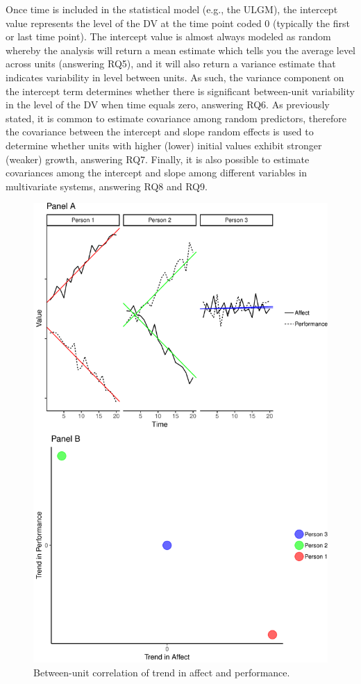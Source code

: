 \documentclass[english,,man]{apa6}
\theoremstyle{definition}
\theoremstyle{definition}
\theoremstyle{definition}
\theoremstyle{remark}
\begin{document}
Once time is included in the statistical model (e.g., the ULGM), the
intercept value represents the level of the DV at the time point coded 0
(typically the first or last time point). The intercept value is almost
always modeled as random whereby the analysis will return a mean
estimate which tells you the average level across units (answering RQ5),
and it will also return a variance estimate that indicates variability
in level between units. As such, the variance component on the intercept
term determines whether there is significant between-unit variability in
the level of the DV when time equals zero, answering RQ6. As previously
stated, it is common to estimate covariance among random predictors,
therefore the covariance between the intercept and slope random effects
is used to determine whether units with higher (lower) initial values
exhibit stronger (weaker) growth, answering RQ7. Finally, it is also
possible to estimate covariances among the intercept and slope among
different variables in multivariate systems, answering RQ8 and RQ9.

\begin{figure}
\centering
\includegraphics{figures/unnamed-chunk-10-1.pdf}
\caption{\label{fig:unnamed-chunk-10}Between-unit correlation of trend in
affect and performance.\label{trend_correlation}}
\end{figure}
\end{document}
